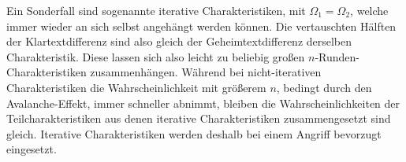 \documentclass{article}
\begin{document}
	Ein Sonderfall sind sogenannte iterative Charakteristiken, mit $\Omega_1 = \Omega_2$, welche immer wieder an sich selbst angehängt werden können. Die vertauschten Hälften der Klartextdifferenz sind also gleich der Geheimtextdifferenz derselben Charakteristik. Diese lassen sich also leicht zu beliebig großen $n$-Runden-Charakteristiken zusammenhängen. Während bei nicht-iterativen Charakteristiken die Wahrscheinlichkeit mit größerem $n$, bedingt durch den Avalanche-Effekt, immer schneller abnimmt, bleiben die Wahrscheinlichkeiten der Teilcharakteristiken aus denen iterative Charakteristiken zusammengesetzt sind gleich. Iterative Charakteristiken werden deshalb bei einem Angriff bevorzugt eingesetzt.
	
\end{document}
